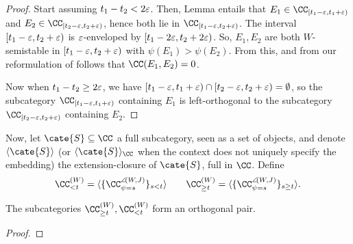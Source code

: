 \begin{proof}
Start assuming $t_1-t_2<2\varepsilon$. Then, Lemma  entails that $E_1\in\CC_{[t_1-\eps,t_1+\eps)}$ and $E_2\in\CC_{[t_2-\eps,t_2+\eps)}$, hence both lie in $\CC_{[t_1-\eps,t_2+\eps)}$. The interval $[t_1-\varepsilon,t_2+\varepsilon)$ is $\varepsilon$-enveloped by $[t_1-2\varepsilon,t_2+2\varepsilon)$.%
So, $E_1, E_2$ are both $W$-semistable in $[t_1-\varepsilon,t_2+\varepsilon)$ with $\psi(E_1)>\psi(E_2)$.  From this, and from our reformulation of  follows that $\CC(E_1,E_2)=0$.

Now when $t_1-t_2\geq 2\varepsilon$, we have $[t_1-\varepsilon,t_1+\varepsilon)\cap [t_2-\varepsilon,t_2+\varepsilon)=\emptyset$, so the subcategory $\CC_{[t_1-\eps,t_1+\eps)}$ containing $E_1$ is left-orthogonal to the subcategory $\CC_{[t_2-\eps,t_2+\eps)}$ containing $E_2$. 
\end{proof}
Now, let $\cate{S}\subseteq \CC$ a full subcategory, seen as a set of objects, and denote $\langle \cate{S}\rangle$ (or $\langle \cate{S}\rangle_{\CC}$ when the context does not uniquely specify the embedding) the extension\hyp{}closure of $\cate{S}$, full in $\CC$. Define
\[\label{these.are.the.aisles}
\CC^{(W)}_{< t}=\langle \{\CC^{\semi(W,J)}_{\psi=s}\}_{s<t}\rangle\qquad \CC^{(W)}_{\geq t}=\langle \{\CC^{\semi(W,J)}_{\psi=s}\}_{s\geq t}\rangle.
\]
\begin{lemma}
The subcategories $\CC^{(W)}_{\geq t}, \CC^{(W)}_{<t}$ form an orthogonal pair.
\end{lemma}
\begin{proof}
\end{proof}
\hrulefill

